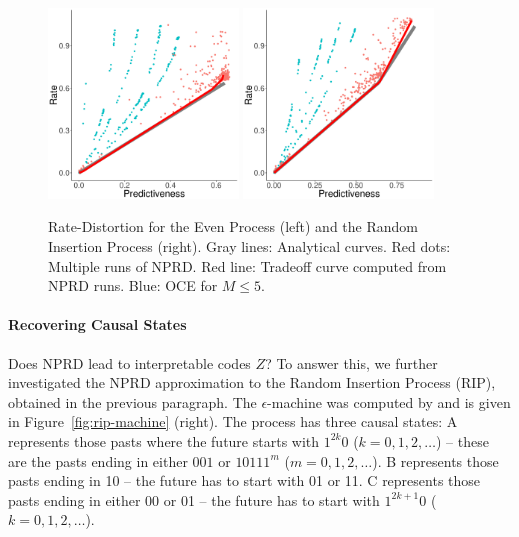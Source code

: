 \documentclass[11pt,letterpaper]{article}
\begin{document}
\begin{figure}
\includegraphics[width=0.45\textwidth]{code/figures/even-info.pdf}
\includegraphics[width=0.45\textwidth]{code/figures/rip-info.pdf}

	\caption{Rate-Distortion for the Even Process (left) and the Random Insertion Process (right). Gray lines: Analytical curves. Red dots: Multiple runs of NPRD. Red line: Tradeoff curve computed from NPRD runs. Blue: OCE for $M\leq 5$. }\label{fig:even}
\end{figure}

\paragraph{Recovering Causal States}
Does NPRD lead to interpretable codes $Z$?
To answer this, we further investigated the NPRD approximation to the Random Insertion Process (RIP), obtained in the previous paragraph.
The $\epsilon$-machine was computed by  \cite{marzen-predictive-2016} and is given in Figure~\ref{fig:rip-machine} (right).
The process has three causal states:
A represents those pasts where the future starts with $1^{2k}0$ ($k = 0, 1, 2, \dots$) -- these are the pasts ending in either $001$ or $10111^m$ ($m= 0, 1, 2, \dots$). %
B represents those pasts ending in 10 -- the future has to start with 01 or 11.
C represents those pasts ending in either 00 or 01 -- the future has to start with $1^{2k+1}0$ ($k = 0, 1, 2, \dots$).
\end{document}
